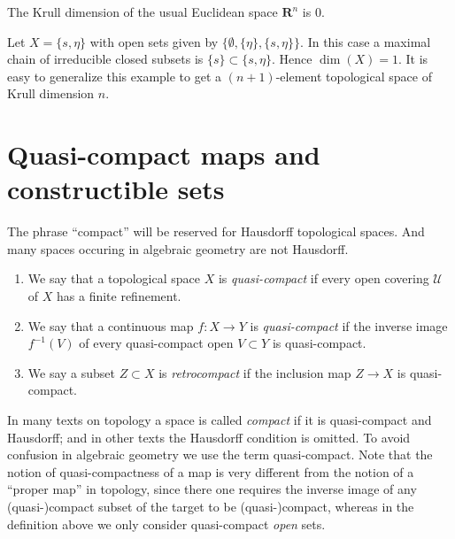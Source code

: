 \begin{example}
\label{example-Krull-Rn}
The Krull dimension of the usual Euclidean space
$\mathbf{R}^n$ is $0$.
\end{example}

\begin{example}
\label{example-krull-2set}
Let $X = \{s, \eta\}$ with open sets given
by $\{\emptyset, \{\eta\}, \{s, \eta\}\}$.
In this case a maximal chain of irreducible
closed subsets is $\{s\} \subset \{s,\eta\}$.
Hence $\dim(X) = 1$. It is easy to generalize
this example to get a $(n+1)$-element topological
space of Krull dimension $n$.
\end{example}



\section{Quasi-compact maps and constructible sets}
\label{section-quasi-compact}

\noindent
The phrase ``compact'' will be reserved
for Hausdorff topological spaces. And many spaces occuring
in algebraic geometry are not Hausdorff.

\begin{definition}
\label{definition-quasi-compact}
\begin{enumerate}
\item We say that a topological space $X$ is {\it quasi-compact}
if every open covering $\mathcal{U}$ of $X$ has a finite
refinement.
\item We say that a continuous map $f : X \to Y$ is {\it quasi-compact}
if the inverse image $f^{-1}(V)$ of every quasi-compact open $V \subset Y$
is quasi-compact.
\item We say a subset $Z \subset X$ is {\it retrocompact}
if the inclusion map $Z \to X$ is quasi-compact.
\end{enumerate}
\end{definition}

\noindent
In many texts on topology a space is called {\it compact} if it
is quasi-compact and Hausdorff; and in other texts the Hausdorff
condition is omitted. To avoid confusion in algebraic geometry
we use the term quasi-compact. Note that the notion of quasi-compactness
of a map is very different from the notion of a ``proper map''
in topology, since there one requires the inverse image of any
(quasi-)compact subset of the target to be (quasi-)compact,
whereas in the definition above we only consider quasi-compact
{\it open} sets.

